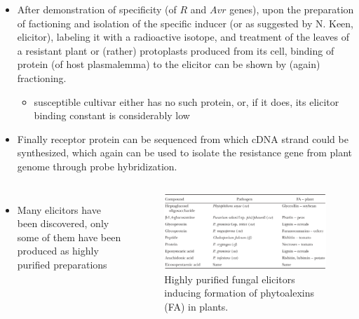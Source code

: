 \documentclass[11pt,dvipsnames,ignorenonframetext,aspectratio=169]{beamer}
\providecommand{\tightlist}{%
  \setlength{\itemsep}{0pt}\setlength{\parskip}{0pt}}
\newcommand{\bcolumns}{\begin{columns}[T, onlytextwidth]}
\newcommand{\ecolumns}{\end{columns}}
\begin{document}

\begin{frame}{}
\protect\hypertarget{section-16}{}
\footnotesize

\begin{itemize}
\tightlist
\item
  After demonstration of specificity (of \(R\) and \(Avr\) genes), upon
  the preparation of factioning and isolation of the specific inducer
  (or as suggested by N. Keen, elicitor), labeling it with a radioactive
  isotope, and treatment of the leaves of a resistant plant or (rather)
  protoplasts produced from its cell, binding of protein (of host
  plasmalemma) to the elicitor can be shown by (again) fractioning.

  \begin{itemize}
  \scriptsize
  \item susceptible cultivar either has no such protein, or, if it does, its elicitor binding constant is considerably low
  \end{itemize}
\item
  Finally receptor protein can be sequenced from which cDNA strand could
  be synthesized, which again can be used to isolate the resistance gene
  from plant genome through probe hybridization.
\end{itemize}

\bcolumns
{}
\footnotesize

\begin{itemize}
\tightlist
\item
  Many elicitors have been discovered, only some of them have been
  produced as highly purified preparations
\end{itemize}


\begin{figure}
\includegraphics[width=0.68\linewidth]{../images/elicitor_proteins_purified} \caption{Highly purified fungal elicitors inducing formation of phytoalexins (FA) in plants.}\label{fig:fungal-elicitors}
\end{figure}

\ecolumns
\end{frame}
\end{document}

